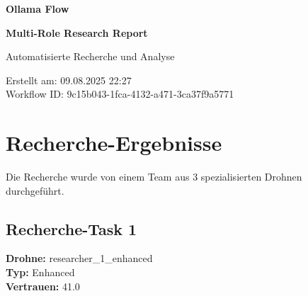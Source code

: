 \documentclass[12pt,a4paper]{article}
\begin{document}
\begin{titlepage}
    \centering
    
    \vspace*{2cm}
    
    {\Huge\bfseries Ollama Flow}
    
    {\Huge\bfseries Multi-Role Research Report}
    
    \vspace{2cm}
    
    {\Large Automatisierte Recherche und Analyse}
    
    \vspace{3cm}
    
    
    \vspace{2cm}
    
    
    \vfill
    
    {\large
    Erstellt am: 09.08.2025 22:27\\
    Workflow ID: 9c15b043-1fca-4132-a471-3ca37f9a5771
    }
    
\end{titlepage}

\newpage
\tableofcontents
\newpage

\section{Recherche-Ergebnisse}

Die Recherche wurde von einem Team aus 3 spezialisierten Drohnen durchgeführt.

\subsection{Recherche-Task 1}

\textbf{Drohne:} researcher\_1\_enhanced\\
\textbf{Typ:} Enhanced\\
\textbf{Vertrauen:} 41.0%
\end{document}
